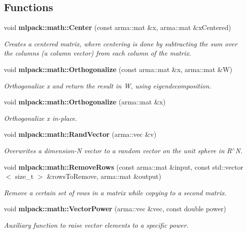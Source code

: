 \subsection*{Functions}
\begin{DoxyCompactItemize}
\item 
void {\bf mlpack\-::math\-::\-Center} (const arma\-::mat \&x, arma\-::mat \&x\-Centered)
\begin{DoxyCompactList}\small\item\em Creates a centered matrix, where centering is done by subtracting the sum over the columns (a column vector) from each column of the matrix. \end{DoxyCompactList}\item 
void {\bf mlpack\-::math\-::\-Orthogonalize} (const arma\-::mat \&x, arma\-::mat \&W)
\begin{DoxyCompactList}\small\item\em Orthogonalize x and return the result in W, using eigendecomposition. \end{DoxyCompactList}\item 
void {\bf mlpack\-::math\-::\-Orthogonalize} (arma\-::mat \&x)
\begin{DoxyCompactList}\small\item\em Orthogonalize x in-\/place. \end{DoxyCompactList}\item 
void {\bf mlpack\-::math\-::\-Rand\-Vector} (arma\-::vec \&v)
\begin{DoxyCompactList}\small\item\em Overwrites a dimension-\/\-N vector to a random vector on the unit sphere in R$^\wedge$\-N. \end{DoxyCompactList}\item 
void {\bf mlpack\-::math\-::\-Remove\-Rows} (const arma\-::mat \&input, const std\-::vector$<$ size\-\_\-t $>$ \&rows\-To\-Remove, arma\-::mat \&output)
\begin{DoxyCompactList}\small\item\em Remove a certain set of rows in a matrix while copying to a second matrix. \end{DoxyCompactList}\item 
void {\bf mlpack\-::math\-::\-Vector\-Power} (arma\-::vec \&vec, const double power)
\begin{DoxyCompactList}\small\item\em Auxiliary function to raise vector elements to a specific power. \end{DoxyCompactList}\item 

\end{DoxyCompactItemize}
